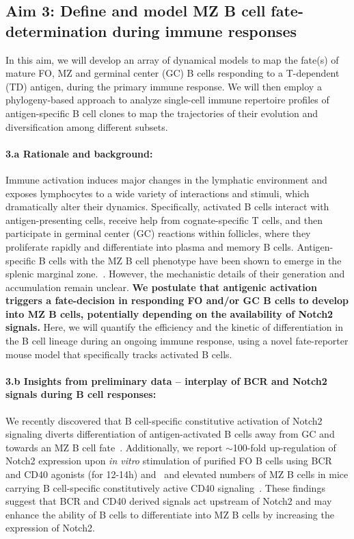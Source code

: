 \documentclass[11pt]{article}
\newcommand{\para}[1]{\vspace*{-4.5mm}\paragraph{#1}}
\begin{document}
\subsection*{Aim 3: Define and model MZ B cell fate-determination during immune responses}
\vspace*{-1mm}
In this aim, we will develop an array of dynamical models to map the fate(s) of mature FO, MZ and germinal center (GC) B cells responding to a T-dependent (TD) antigen, during the primary immune response.
We will then employ a phylogeny-based approach to analyze single-cell immune repertoire profiles of antigen-specific B cell clones to map the trajectories of their evolution and diversification among different subsets. 


\para{{3.a Rationale and background:}}
Immune activation induces major changes in the lymphatic environment and exposes lymphocytes to a wide variety of interactions and stimuli, which dramatically alter their dynamics. 
Specifically, activated B cells interact with antigen-presenting cells, receive help from cognate-specific T cells, and then participate in germinal center (GC) reactions within follicles, where they proliferate rapidly and differentiate into plasma and memory B cells. 
Antigen-specific B cells with the MZ B cell phenotype have been shown to emerge in the splenic marginal zone.~\cite{Liu_1988, Yang_Shih_2002}.
However, the mechanistic details of their generation and accumulation remain unclear.
\textbf{We postulate that antigenic activation triggers a fate-decision in responding FO and/or GC B cells to develop into MZ B cells, potentially depending on the availability of Notch2 signals. }
Here, we will quantify the efficiency and the kinetic of differentiation in the B cell lineage during an ongoing immune response, using a novel fate-reporter mouse model that specifically tracks activated B cells.


\para{{3.b Insights from preliminary data -- interplay of BCR and Notch2 signals during B cell responses:}}
We recently discovered that B cell-specific constitutive activation of Notch2 signaling diverts differentiation of antigen-activated B cells away from GC and towards an MZ B cell fate~\cite{Babushku:2022}.
Additionally, we report $\sim$100-fold up-regulation of Notch2 expression upon \textit{in vitro} stimulation of purified FO B cells using BCR and CD40 agonists (for 12-14h)  and~\cite{Babushku:2022} and elevated numbers of MZ B cells in mice carrying B cell-specific constitutively active CD40 signaling~\cite{Homig_Holzel_2008}.
These findings suggest that BCR and CD40 derived signals act upstream of Notch2 and may enhance the ability of B cells to differentiate into MZ B cells by increasing the expression of Notch2.
\end{document}
